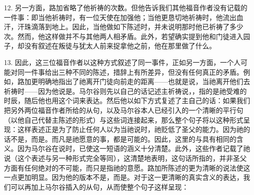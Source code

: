 12. 另一方面，路加省略了他祈祷的次数。但他告诉我们其他福音作者没有记载的一件事：即当他祈祷时，有一位天使在加强他；当他更恳切地祈祷时，他流出血汗，汗珠滴落到地上。因此，当他做如下陈述时，并未说明那时他已祈祷了多少次。然而，他这样做并不与其他两人相矛盾。此外，若望确实提到他和门徒进入园子，却没有叙述在叛徒与犹太人前来捉拿他之前，他在那里做了什么。\par

13. 因此，这三位福音作者以这种方式叙述了同一事件，正如另一方面，一个人可能对同一件事给出三种不同的陈述，措辞上有所差异，但没有任何真正的矛盾。例如，路加更明确地指出了祂离开门徒向前走的距离——也就是说，当祂离开他们去祈祷时——因为他说是。\newline{}马尔谷则先以自己的话记述主祈祷说，，指的是祂受难的时辰，随后他也用这个词来表达。然后他以如下方式复述了主自己的话：如果我们把另外两位福音作者所给的从句，以及马尔谷本人已经引入的一个清晰的平行句（以他自己代替主陈述的形式）与这些词连接起来，那么整个句子将以这种形式呈现：这样表述正是为了防止任何人以为当祂说时，祂贬低了圣父的能力。因为祂的话不是，而是。而凡是祂愿意的事，都是可能的。因此，这里的与具有相同的含义。因为马尔谷在说时，已使这一短语的涵义十分清楚。此外，这些作者记载了祂说（这个表述与另一种形式完全等同），这清楚地表明，这句话所指的，并非圣父方面有任何绝对的不可能，而只是指祂的意愿。路加所陈述的更为清晰的说法使这一点更加明显。因为他的版本不是，而是。对于这一更清晰的真实含义的表达，我们可以再加上马尔谷插入的从句，从而使整个句子这样呈现：\par

